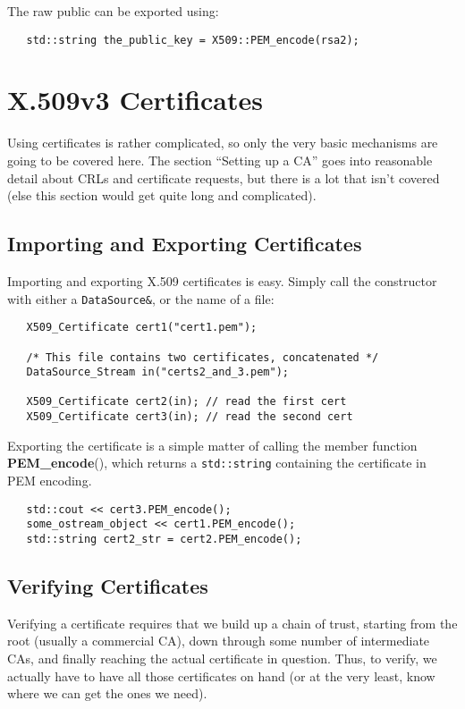 \documentclass{article}
\newcommand{\function}[1]{\textbf{#1}}
\newcommand{\type}[1]{\texttt{#1}}
\begin{document}
The raw public can be exported using:

\begin{verbatim}
   std::string the_public_key = X509::PEM_encode(rsa2);
\end{verbatim}

\pagebreak

\section{X.509v3 Certificates}

Using certificates is rather complicated, so only the very basic mechanisms are
going to be covered here. The section ``Setting up a CA'' goes into reasonable
detail about CRLs and certificate requests, but there is a lot that isn't
covered (else this section would get quite long and complicated).

\subsection{Importing and Exporting Certificates}

Importing and exporting X.509 certificates is easy. Simply call the constructor
with either a \type{DataSource\&}, or the name of a file:

\begin{verbatim}
   X509_Certificate cert1("cert1.pem");

   /* This file contains two certificates, concatenated */
   DataSource_Stream in("certs2_and_3.pem");

   X509_Certificate cert2(in); // read the first cert
   X509_Certificate cert3(in); // read the second cert
\end{verbatim}

Exporting the certificate is a simple matter of calling the member function
\function{PEM\_encode}(), which returns a \type{std::string} containing the
certificate in PEM encoding.

\begin{verbatim}
   std::cout << cert3.PEM_encode();
   some_ostream_object << cert1.PEM_encode();
   std::string cert2_str = cert2.PEM_encode();
\end{verbatim}

\subsection{Verifying Certificates}

Verifying a certificate requires that we build up a chain of trust, starting
from the root (usually a commercial CA), down through some number of
intermediate CAs, and finally reaching the actual certificate in
question. Thus, to verify, we actually have to have all those certificates
on hand (or at the very least, know where we can get the ones we need).
\end{document}
